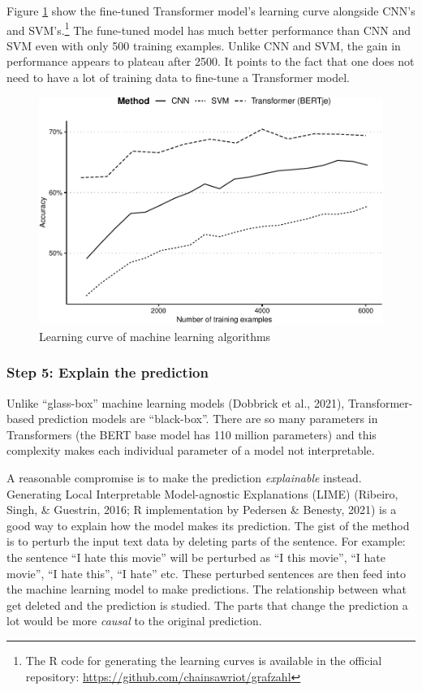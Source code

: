 \documentclass[
  english,
  man,floatsintext]{apa7}
\begin{document}
Figure \ref{fig:fig2} show the fine-tuned Transformer model's learning curve alongside CNN's and SVM's.\footnote{The R code for generating the learning curves is available in the official repository: \url{https://github.com/chainsawriot/grafzahl}} The fune-tuned model has much better performance than CNN and SVM even with only 500 training examples. Unlike CNN and SVM, the gain in performance appears to plateau after 2500. It points to the fact that one does not need to have a lot of training data to fine-tune a Transformer model.

\begin{figure}
\centering
\includegraphics{fig2-1.pdf}
\caption{\label{fig:fig2}Learning curve of machine learning algorithms}
\end{figure}

\hypertarget{step-5-explain-the-prediction}{%
\subsubsection{Step 5: Explain the prediction}\label{step-5-explain-the-prediction}}

Unlike ``glass-box'' machine learning models (Dobbrick et al., 2021), Transformer-based prediction models are ``black-box''. There are so many parameters in Transformers (the BERT base model has 110 million parameters) and this complexity makes each individual parameter of a model not interpretable.

A reasonable compromise is to make the prediction \emph{explainable} instead. Generating Local Interpretable Model-agnostic Explanations (LIME) (Ribeiro, Singh, \& Guestrin, 2016; R implementation by Pedersen \& Benesty, 2021) is a good way to explain how the model makes its prediction. The gist of the method is to perturb the input text data by deleting parts of the sentence. For example: the sentence ``I hate this movie'' will be perturbed as ``I this movie'', ``I hate movie'', ``I hate this'', ``I hate'' etc. These perturbed sentences are then feed into the machine learning model to make predictions. The relationship between what get deleted and the prediction is studied. The parts that change the prediction a lot would be more \emph{causal} to the original prediction.
\end{document}

